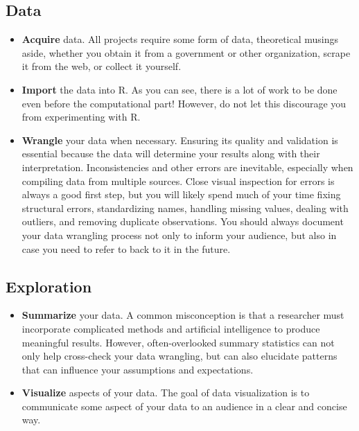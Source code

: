\documentclass[
]{article}
\providecommand{\tightlist}{%
  \setlength{\itemsep}{0pt}\setlength{\parskip}{0pt}}
\begin{document}
\hypertarget{data}{%
\subsection{Data}\label{data}}

\begin{itemize}
\tightlist
\item
  \textbf{Acquire} data. All projects require some form of data,
  theoretical musings aside, whether you obtain it from a government or
  other organization, scrape it from the web, or collect it yourself.
\item
  \textbf{Import} the data into R. As you can see, there is a lot of
  work to be done even before the computational part! However, do not
  let this discourage you from experimenting with R.
\item
  \textbf{Wrangle} your data when necessary. Ensuring its quality and
  validation is essential because the data will determine your results
  along with their interpretation. Inconsistencies and other errors are
  inevitable, especially when compiling data from multiple sources.
  Close visual inspection for errors is always a good first step, but
  you will likely spend much of your time fixing structural errors,
  standardizing names, handling missing values, dealing with outliers,
  and removing duplicate observations. You should always document your
  data wrangling process not only to inform your audience, but also in
  case you need to refer to back to it in the future.
\end{itemize}

\hypertarget{exploration}{%
\subsection{Exploration}\label{exploration}}

\begin{itemize}
\tightlist
\item
  \textbf{Summarize} your data. A common misconception is that a
  researcher must incorporate complicated methods and artificial
  intelligence to produce meaningful results. However, often-overlooked
  summary statistics can not only help cross-check your data wrangling,
  but can also elucidate patterns that can influence your assumptions
  and expectations.
\item
  \textbf{Visualize} aspects of your data. The goal of data
  visualization is to communicate some aspect of your data to an
  audience in a clear and concise way.
\end{itemize}
\end{document}
